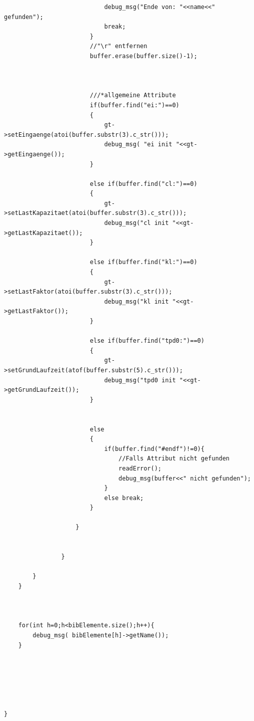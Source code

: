 \documentclass[a4paper,10pt,twoside]{report}
\begin{document}
\begin{lstlisting}
                            debug_msg("Ende von: "<<name<<" gefunden");
                            break;
                        }
                        //"\r" entfernen
                        buffer.erase(buffer.size()-1);



                        ///*allgemeine Attribute
                        if(buffer.find("ei:")==0)
                        {
                            gt->setEingaenge(atoi(buffer.substr(3).c_str()));
                            debug_msg( "ei init "<<gt->getEingaenge());
                        }

                        else if(buffer.find("cl:")==0)
                        {
                            gt->setLastKapazitaet(atoi(buffer.substr(3).c_str()));
                            debug_msg("cl init "<<gt->getLastKapazitaet());
                        }

                        else if(buffer.find("kl:")==0)
                        {
                            gt->setLastFaktor(atoi(buffer.substr(3).c_str()));
                            debug_msg("kl init "<<gt->getLastFaktor());
                        }

                        else if(buffer.find("tpd0:")==0)
                        {
                            gt->setGrundLaufzeit(atof(buffer.substr(5).c_str()));
                            debug_msg("tpd0 init "<<gt->getGrundLaufzeit());
                        }


                        else
                        {
                            if(buffer.find("#endf")!=0){
                                //Falls Attribut nicht gefunden
                                readError();
                                debug_msg(buffer<<" nicht gefunden");
                            }
                            else break;
                        }

                    }


                }

        }
    }



    for(int h=0;h<bibElemente.size();h++){
        debug_msg( bibElemente[h]->getName());
    }






}

\end{lstlisting}
\end{document}
